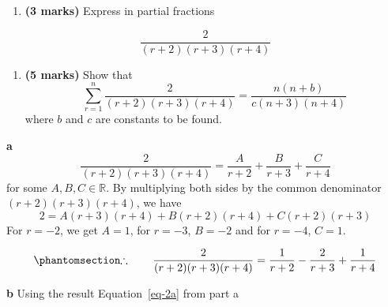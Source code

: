 \documentclass[
  a4paper,
]{report}
\providecommand{\tightlist}{%
  \setlength{\itemsep}{0pt}\setlength{\parskip}{0pt}}\usepackage{longtable,booktabs,array}
\begin{document}
\begin{enumerate}
\def\labelenumi{\alph{enumi}.}
\tightlist
\item
  \textbf{(3 marks)} Express in partial fractions
\end{enumerate}

\[\frac{2}{(r+2)(r+3)(r+4)}\]

\begin{enumerate}
\def\labelenumi{\alph{enumi}.}
\setcounter{enumi}{1}
\tightlist
\item
  \textbf{(5 marks)} Show that
  \[\sum_{r=1}^{n}{\frac{2}{(r+2)(r+3)(r+4)}=\frac{n(n+b)}{c(n+3)(n+4)}}\]
  where \(b\) and \(c\) are constants to be found.
\end{enumerate}

\begin{tcolorbox}[enhanced jigsaw, leftrule=.75mm, left=2mm, opacitybacktitle=0.6, breakable, bottomtitle=1mm, colframe=quarto-callout-tip-color-frame, opacityback=0, colbacktitle=quarto-callout-tip-color!10!white, toptitle=1mm, arc=.35mm, titlerule=0mm, coltitle=black, rightrule=.15mm, bottomrule=.15mm, toprule=.15mm, title={Solution}, colback=white]

\textbf{a}
\[\frac{2}{(r+2)(r+3)(r+4)} = \frac{A}{r+2}+\frac{B}{r+3}+\frac{C}{r+4}\]
for some \(A, B, C \in \mathbb{R}\). By multiplying both sides by the
common denominator \((r+2)(r+3)(r+4)\), we have
\[2=A(r+3)(r+4)+B(r+2)(r+4)+C(r+2)(r+3)\] For \(r=-2\), we get \(A=1\),
for \(r=-3\), \(B=-2\) and for \(r=-4\), \(C=1\).

\begin{equation}\phantomsection\label{eq-2a}{\therefore \qquad \frac{2}{(r+2)(r+3)(r+4)} = \frac{1}{r+2}-\frac{2}{r+3}+\frac{1}{r+4} }\end{equation}

\textbf{b} Using the result Equation~\ref{eq-2a} from part a


\end{tcolorbox}
\end{document}
